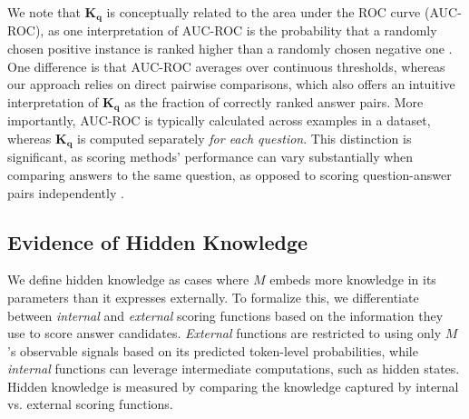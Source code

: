 \vspace{-15pt}
We note that $\mathbf{K_q}$ is conceptually related to the area under the ROC curve (AUC-ROC), as one interpretation of AUC-ROC is the probability that a randomly chosen positive instance is ranked higher than a randomly chosen negative one \citep{Hanley1982,fawcett2006prl}. One difference is that AUC-ROC averages over continuous thresholds, whereas our approach relies on direct pairwise comparisons, which also offers an intuitive interpretation of $\mathbf{K_q}$ as the fraction of correctly ranked answer pairs. More importantly, AUC-ROC is typically calculated across examples in a dataset, whereas $\mathbf{K_q}$ is computed separately \textit{for each question}. This distinction is significant, as scoring methods' performance can vary substantially when comparing answers to the same question, as opposed to scoring question-answer pairs independently \citep{taubenfeld2025confidence}.




\vspace{-5pt}
\subsection{Evidence of Hidden Knowledge}
\label{sec:hidden_knowledge_def}
\vspace{-5pt}


We define hidden knowledge as cases where $M$ embeds more knowledge in its parameters than it expresses externally. To formalize this, we differentiate between \textit{internal} and \textit{external} scoring functions based on the information they use to score answer candidates. 
\textit{External} functions are restricted to using only $M$'s observable signals based on its 
predicted token-level probabilities, while \textit{internal} functions can leverage intermediate computations, such as hidden states. Hidden knowledge is measured by comparing the knowledge captured by internal vs. external scoring functions.

